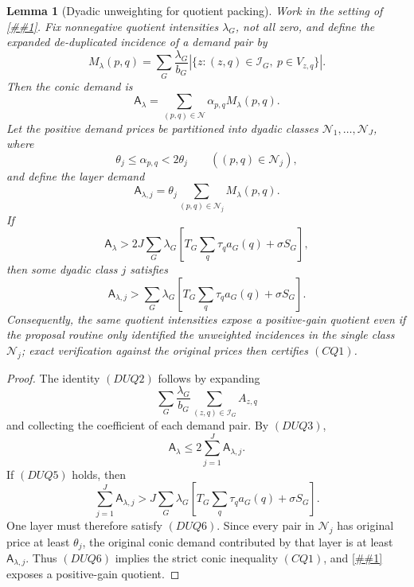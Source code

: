 \documentclass[10pt]{article}
\newcommand{\cref}[1]{\ref{##1}}
\newtheorem{lemma}[theorem]{Lemma}
\theoremstyle{definition}
\begin{document}
\begin{lemma}[Dyadic unweighting for quotient packing]
   \label{lem:dyadic-quotient-packing}
   Work in the setting of \cref{cor:conic-quotient-packing}.  Fix nonnegative
   quotient intensities \(\lambda_G\), not all zero, and define the expanded
   de-duplicated incidence of a demand pair by
   \[
      M_\lambda(p,q)
      =
      \sum_G\frac{\lambda_G}{b_G}
      \left|
         \{z:(z,q)\in\mathcal I_G,\ p\in V_{z,q}\}
      \right|.
      \tag{DUQ1}
   \]
   Then the conic demand is
   \[
      \mathsf A_\lambda
      =
      \sum_{(p,q)\in\mathcal N}\alpha_{p,q}M_\lambda(p,q).
      \tag{DUQ2}
   \]
   Let the positive demand prices be partitioned into dyadic classes
   \(\mathcal N_1,\ldots,\mathcal N_J\), where
   \[
      \theta_j\le\alpha_{p,q}<2\theta_j
      \qquad((p,q)\in\mathcal N_j),
      \tag{DUQ3}
   \]
   and define the layer demand
   \[
      \mathsf A_{\lambda,j}
      =
      \theta_j\sum_{(p,q)\in\mathcal N_j}M_\lambda(p,q).
      \tag{DUQ4}
   \]
   If
   \[
      \mathsf A_\lambda
      >
      2J
      \sum_G\lambda_G
      \left[
         T_G\sum_q\tau_qa_G(q)+\sigma S_G
      \right],
      \tag{DUQ5}
   \]
   then some dyadic class \(j\) satisfies
   \[
      \mathsf A_{\lambda,j}
      >
      \sum_G\lambda_G
      \left[
         T_G\sum_q\tau_qa_G(q)+\sigma S_G
      \right].
      \tag{DUQ6}
   \]
   Consequently, the same quotient intensities expose a positive-gain quotient
   even if the proposal routine only identified the unweighted incidences in the
   single class \(\mathcal N_j\); exact verification against the original prices
   then certifies \((CQ1)\).
\end{lemma}

\begin{proof}
   The identity \((DUQ2)\) follows by expanding
   \[
      \sum_G\frac{\lambda_G}{b_G}
      \sum_{(z,q)\in\mathcal I_G}A_{z,q}
   \]
   and collecting the coefficient of each demand pair.  By \((DUQ3)\),
   \[
      \mathsf A_\lambda
      \le
      2\sum_{j=1}^J\mathsf A_{\lambda,j}.
   \]
   If \((DUQ5)\) holds, then
   \[
      \sum_{j=1}^J\mathsf A_{\lambda,j}
      >
      J
      \sum_G\lambda_G
      \left[
         T_G\sum_q\tau_qa_G(q)+\sigma S_G
      \right].
   \]
   One layer must therefore satisfy \((DUQ6)\).  Since every pair in
   \(\mathcal N_j\) has original price at least \(\theta_j\), the original conic
   demand contributed by that layer is at least \(\mathsf A_{\lambda,j}\).  Thus
   \((DUQ6)\) implies the strict conic inequality \((CQ1)\), and
   \cref{cor:conic-quotient-packing} exposes a positive-gain quotient.
\end{proof}
\end{document}
